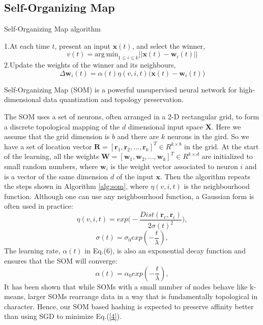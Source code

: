 \documentclass{article}
\begin{document}
\subsection{Self-Organizing Map}
\begin{algorithm}[tb]
	\caption{Self-Organizing Map algorithm}
	\label{alg:som}
	\begin{algorithmic}
		\Repeat
		\State 1.At each time $t$, present an input $\mathbf{x}(t)$, and select the winner,
		\begin{equation}\label{5}
		v(t) = \mathrm{arg\ min}_{1 \leq i \leq k} || \mathbf{x}(t) - \mathbf{w}_{i}(t)||
		\end{equation}
		\State 2.Update the weights of the winner and its neighbours,
		\begin{equation}\label{6}
		\Delta\mathbf{w}_{i}(t) = \alpha(t)\eta(v, i, t)\big(\mathbf{x}(t) - \mathbf{w}_{i}(t)\big)
		\end{equation}
	\end{algorithmic}
\end{algorithm}
Self-Organizing Map (SOM) \cite{kohonen1998self} is a powerful unsupervised neural network  for high-dimensional  data quantization
and topology preservation.

The SOM uses a set of neurons, often arranged in a 2-D rectangular 
grid, to form a discrete topological mapping of the $d$ dimensional input space  $\mathbf{X}$. Here we assume that the grid dimension is $b$ and there are $k$ neurons in the gird. So we have a set of location vector $\mathbf{R} = [\mathbf{r}_{1},  \mathbf{r}_{2}, ..., \mathbf{r}_{k}]^{T} \in R^{k\times b}$ in the grid. At the start of the learning,
all the weights $\mathbf{W} = [\mathbf{w}_{1},  \mathbf{w}_{2}, ..., \mathbf{w}_{k}]^{T} \in R^{k\times d}$ are initialized
to small random numbers, where $\mathbf{w}_{i}$ is the weight vector associated to neuron $i$ and
is a vector of the same dimension $d$ of the input $\mathbf{x}$. Then
the algorithm repeats the steps shown in Algorithm \ref{alg:som}, where $\eta(v, i, t)$ is the
neighbourhood function.
Although one can use any neighbourhood function, a Gaussian form is
often used in practice:
\begin{equation}\label{7}
\eta(v, i, t) = exp\Big(-\frac{Dist(\mathbf{r}_{v} , \mathbf{r}_{i})}{2\sigma(t)^{2}}\Big),
\end{equation}
\begin{equation}\label{8}
\sigma(t) = \sigma_{0}exp(-\frac{t}{\lambda}),
\end{equation}
The learning rate, $\alpha(t)$ in Eq.(6), is also an exponential decay function and ensures that the SOM will converge:
\begin{equation}\label{9}
\alpha(t) = \alpha_{0}exp(-\frac{t}{\lambda}),
\end{equation}
It has been shown that while SOMs with a small number of nodes behave like k-means, larger SOMs rearrange data in a way that is fundamentally  topological in character. Hence, our SOM based hashing is expected to preserve affinity better than using SGD to minimize Eq.(\ref{4}).
\end{document}
